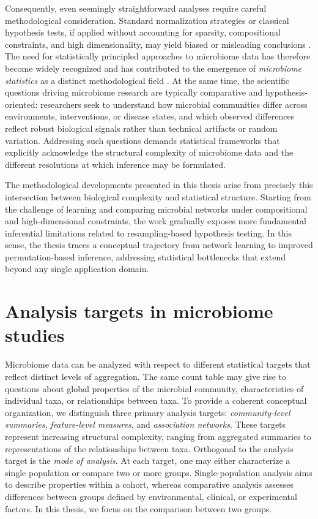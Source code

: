 Consequently, even seemingly straightforward analyses require careful methodological consideration. Standard normalization strategies or classical hypothesis tests, if applied without accounting for sparsity, compositional constraints, and high dimensionality, may yield biased or misleading conclusions \citep{mcmurdie2014waste,weiss2017normalization}. The need for statistically principled approaches to microbiome data has therefore become widely recognized and has contributed to the emergence of \emph{microbiome statistics} as a distinct methodological field \citep{xia2024applied}. At the same time, the scientific questions driving microbiome research are typically comparative and hypothesis-oriented: researchers seek to understand how microbial communities differ across environments, interventions, or disease states, and which observed differences reflect robust biological signals rather than technical artifacts or random variation. Addressing such questions demands statistical frameworks that explicitly acknowledge the structural complexity of microbiome data and the different resolutions at which inference may be formulated.

The methodological developments presented in this thesis arise from precisely this intersection between biological complexity and statistical structure. Starting from the challenge of learning and comparing microbial networks under compositional and high-dimensional constraints, the work gradually exposes more fundamental inferential limitations related to resampling-based hypothesis testing. In this sense, the thesis traces a conceptual trajectory from network learning to improved permutation-based inference, addressing statistical bottlenecks that extend beyond any single application domain.

\section{Analysis targets in microbiome studies}
\label{sec:intro:levels}


Microbiome data can be analyzed with respect to different statistical targets that reflect distinct levels of aggregation. 
The same count table may give rise to questions about global properties of the microbial community, characteristics of individual taxa, or relationships between taxa. 
To provide a coherent conceptual organization, we distinguish three primary analysis targets: \emph{community-level summaries}, \emph{feature-level measures}, and \emph{association networks}. 
These targets represent increasing structural complexity, ranging from aggregated summaries to representations of the relationships between taxa. Orthogonal to the analysis target is the \emph{mode of analysis}. 
At each target, one may either characterize a single population or compare two or more groups. Single-population analysis aims to describe properties within a cohort, whereas comparative analysis assesses differences between groups defined by environmental, clinical, or experimental factors. In this thesis, we focus on the comparison between two groups.

